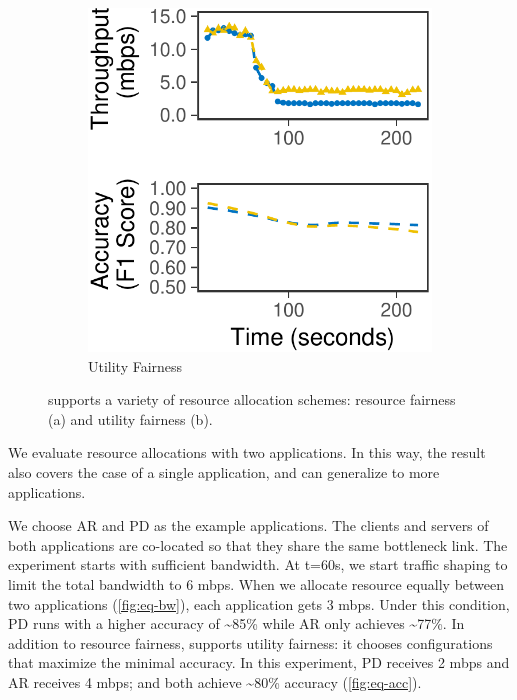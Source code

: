 \begin{figure}
\begin{subfigure}[t]{0.45\columnwidth}
    \includegraphics[width=\textwidth]{figures/multitask-right.pdf}
    \caption{Utility Fairness}
    \label{fig:eq-acc}
  \end{subfigure}
  \caption{\sysname{} supports a variety of resource allocation schemes:
    resource fairness (a) and utility fairness (b).}
  \label{fig:multitask}
\end{figure}

We evaluate resource allocations with two applications. In this way, the result
also covers the case of a single application, and can generalize to more
applications.

We choose AR and PD as the example applications.  The clients and servers of
both applications are co-located so that they share the same bottleneck
link. The experiment starts with sufficient bandwidth. At t=60s, we start
traffic shaping to limit the total bandwidth to 6 mbps. When we allocate
resource equally between two applications (\autoref{fig:eq-bw}), each
application gets 3 mbps. Under this condition, PD runs with a higher accuracy of
\textasciitilde 85\% while AR only achieves \textasciitilde 77\%. In addition to
resource fairness, \sysname{} supports utility fairness: it chooses
configurations that maximize the minimal accuracy. In this experiment, PD
receives 2 mbps and AR receives 4 mbps; and both achieve \textasciitilde 80\%
accuracy (\autoref{fig:eq-acc}).

